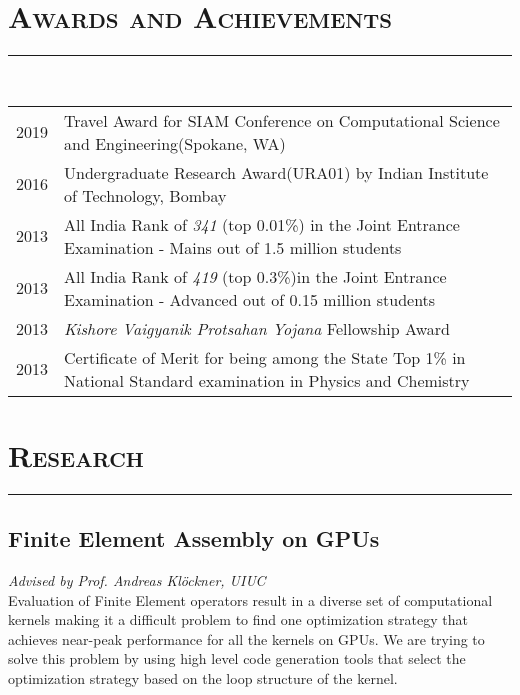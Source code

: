 \documentclass[letterpaper, 13pt]{article}
\begin{document}
\section*{\Large\textsc{Awards and Achievements}}
\vspace{-4ex}
\rule{\textwidth}{0.1ex}
\vspace{1ex}\\
\begin{tabular}{p{} p{}}
2019    &   Travel Award for SIAM Conference on Computational Science and Engineering(Spokane, WA) \vspace{1ex}\\
2016    &   Undergraduate Research Award(URA01) by Indian Institute of Technology, Bombay \vspace{1ex}\\
2013    &   All India Rank of \textit{341} (top 0.01\%) in the Joint Entrance Examination - Mains out of 1.5 million students \vspace{1ex} \\
2013    &   All India Rank of \textit{419} (top 0.3\%)in the Joint Entrance Examination - Advanced out of 0.15 million students\vspace{1ex} \\
2013    &   \textit{Kishore Vaigyanik Protsahan Yojana} Fellowship Award\vspace{1ex} \\
2013    &   Certificate of Merit for being among the State Top 1\% in National Standard examination in Physics and Chemistry \\
\end{tabular} 



\section*{\Large\textsc{Research}}
\vspace{-4ex}
\rule{\textwidth}{0.1ex}

\subsection*{Finite Element Assembly on GPUs}
\vspace{-1ex}
\small \textit{Advised by Prof. Andreas Kl\"{o}ckner, UIUC}\\
Evaluation of Finite Element operators result in a diverse set of computational kernels making it a difficult problem to find one optimization strategy that achieves near-peak performance for all the kernels on GPUs. We are trying to solve this problem by using high level code generation tools that select the optimization strategy based on the loop structure of the kernel.
\end{document}
